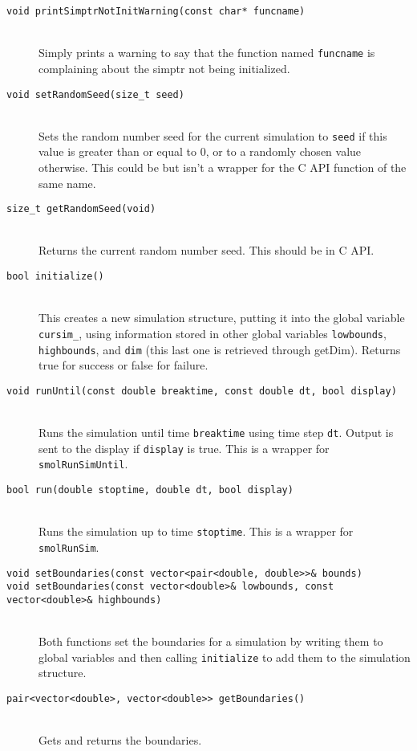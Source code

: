 \documentclass {scrbook}
\newcommand {\ttt} {\texttt}
\begin{document}
\begin{description}
\item[\ttt{void printSimptrNotInitWarning(const char* funcname)}]
\hfill \\
Simply prints a warning to say that the function named \ttt{funcname} is complaining about the simptr not being initialized.

\item[\ttt{void setRandomSeed(size\_t seed)}]
\hfill \\
Sets the random number seed for the current simulation to \ttt{seed} if this value is greater than or equal to 0, or to a randomly chosen value otherwise. This could be but isn't a wrapper for the C API function of the same name.

\item[\ttt{size\_t getRandomSeed(void)}]
\hfill \\
Returns the current random number seed. This should be in C API.

\item[\ttt{bool initialize()}]
\hfill \\
This creates a new simulation structure, putting it into the global variable \ttt{cursim\_}, using information stored in other global variables \ttt{lowbounds}, \ttt{highbounds}, and \ttt{dim} (this last one is retrieved through getDim). Returns true for success or false for failure.

\item[\ttt{void runUntil(const double breaktime, const double dt, bool display)}]
\hfill \\
Runs the simulation until time \ttt{breaktime} using time step \ttt{dt}. Output is sent to the display if \ttt{display} is true. This is a wrapper for \ttt{smolRunSimUntil}.

\item[\ttt{bool run(double stoptime, double dt, bool display)}]
\hfill \\
Runs the simulation up to time \ttt{stoptime}. This is a wrapper for \ttt{smolRunSim}.

\item[\ttt{void setBoundaries(const vector<pair<double, double>>\& bounds)}]
\item[\ttt{void setBoundaries(const vector<double>\& lowbounds, const vector<double>\& highbounds)}]
\hfill \\
Both functions set the boundaries for a simulation by writing them to global variables and then calling \ttt{initialize} to add them to the simulation structure.

\item[\ttt{pair<vector<double>, vector<double>> getBoundaries()}]
\hfill \\
Gets and returns the boundaries.


\end{description}
\end{document}
